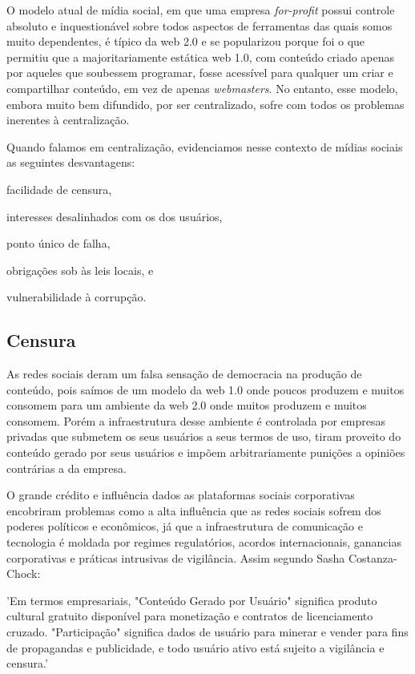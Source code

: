 O modelo atual de mídia social, em que uma empresa \textit{for-profit} possui controle absoluto e inquestionável sobre todos aspectos de ferramentas das quais somos muito dependentes, é típico da web 2.0 e se popularizou porque foi o que permitiu que a majoritariamente estática web 1.0, com conteúdo criado apenas por aqueles que soubessem programar, fosse acessível para qualquer um criar e compartilhar conteúdo, em vez de apenas \textit{webmasters}.
No entanto, esse modelo, embora muito bem difundido, por ser centralizado, sofre com todos os problemas inerentes à centralização. 

Quando falamos em centralização, evidenciamos nesse contexto de mídias sociais as seguintes desvantagens:
\begin{enumerate*}[label=(\arabic*)]
    \item facilidade de censura,
    \item interesses desalinhados com os dos usuários,
    \item ponto único de falha,
    \item obrigações sob às leis locais, e
    \item vulnerabilidade à corrupção.
\end{enumerate*}

\subsection{Censura}
As redes sociais deram um falsa sensação de democracia na produção de conteúdo, pois saímos de um modelo da web 1.0 onde poucos produzem e muitos consomem para um ambiente da web 2.0 onde muitos produzem e muitos consomem. Porém a infraestrutura desse ambiente é controlada por empresas privadas que submetem os seus usuários a seus termos de uso, tiram proveito do conteúdo gerado por seus usuários e impõem arbitrariamente punições a opiniões contrárias a da empresa.

O grande crédito e influência dados as plataformas sociais corporativas encobriram  problemas como a alta influência que as redes sociais sofrem dos poderes políticos e econômicos, já que a infraestrutura de comunicação e tecnologia é moldada por regimes regulatórios, acordos internacionais, ganancias corporativas e práticas intrusivas de vigilância. Assim segundo Sasha Costanza-Chock\cite{Censura1}:


\begin{directcite}
'Em termos empresariais, "Conteúdo Gerado por Usuário" significa produto cultural gratuito disponível para monetização e contratos de licenciamento cruzado. "Participação" significa dados de usuário para minerar e vender para fins de propagandas e publicidade, e todo usuário ativo está sujeito a vigilância e censura.'
\end{directcite}



